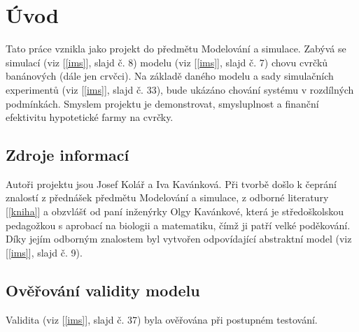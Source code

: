 \documentclass{article}
\begin{document}
    
    \pagestyle{fancy}
    \tableofcontents
    \pagebreak

    \section{Úvod}
    Tato práce vznikla jako projekt do předmětu Modelování a simulace. Zabývá se simulací (viz [\ref{ims}], slajd č. 8)
    modelu (viz [\ref{ims}], slajd č. 7) chovu cvrčků banánových (dále jen crvčci). Na základě daného modelu a sady simulačních experimentů (viz [\ref{ims}], slajd č. 33),
    bude ukázáno chování systému v rozdílných podmínkách. Smyslem projektu je demonstrovat, smysluplnost a finanční efektivitu hypotetické farmy na cvrčky.

    \subsection{Zdroje informací}
    Autoři projektu jsou Josef Kolář a Iva Kavánková. Při tvorbě došlo k čeprání znalostí z přednášek předmětu Modelování a simulace, z odborné literatury
    [\ref{kniha}] a obzvlášť od paní inženýrky Olgy Kavánkové, která je středoškolskou pedagožkou s aprobací na biologii
    a matematiku, čímž ji patří velké poděkování. Díky jejím odborným znalostem byl vytvořen odpovídající abstraktní model
    (viz [\ref{ims}], slajd č. 9).

    \subsection{Ověřování validity modelu}
    Validita (viz [\ref{ims}], slajd č. 37) byla ověřována při postupném testování.
\end{document}
